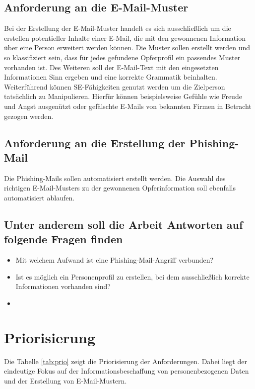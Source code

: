 	\subsection{Anforderung an die E-Mail-Muster}
	Bei der Erstellung der E-Mail-Muster handelt es sich ausschließlich um die erstellen potentieller Inhalte einer E-Mail, die mit den gewonnenen Information über eine Person erweitert werden können. Die Muster sollen erstellt werden und so klassifiziert sein, dass für jedes gefundene Opferprofil ein passendes Muster vorhanden ist. Des Weiteren soll der E-Mail-Text mit den eingesetzten Informationen Sinn ergeben und eine korrekte Grammatik beinhalten. Weiterführend können SE-Fähigkeiten genutzt werden um die Zielperson tatsächlich zu Manipulieren. Hierfür können beispielsweise Gefühle wie Freude und Angst ausgenützt oder gefälschte E-Mails von bekannten Firmen in Betracht gezogen werden.
	
	\subsection{Anforderung an die Erstellung der Phishing-Mail}
	Die Phishing-Mails sollen automatisiert erstellt werden. Die Auswahl des richtigen E-Mail-Musters zu der gewonnenen Opferinformation soll ebenfalls automatisiert ablaufen.
	
	\subsection{Unter anderem soll die Arbeit Antworten auf folgende Fragen finden}
	\begin{itemize}
		\item Mit welchem Aufwand ist eine Phishing-Mail-Angriff verbunden?
		\item Ist es möglich ein Personenprofil zu erstellen, bei dem ausschließlich korrekte Informationen vorhanden sind?
		\item 
	\end{itemize}
\FloatBarrier

\section{Priorisierung} %
\label{sec:} %
Die Tabelle \ref{tab:prio} zeigt die Priorisierung der Anforderungen. Dabei liegt der eindeutige Fokus auf der Informationsbeschaffung von personenbezogenen Daten und der Erstellung von E-Mail-Mustern.

